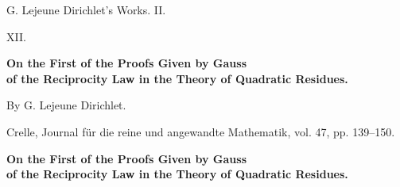 \documentclass[11pt]{article}
\begin{document}
\begin{center}
{\Large G. Lejeune Dirichlet's Works. II.}\par\vspace{1.2em}
{\Large XII.}\par\vspace{0.5em}
{\LARGE \textbf{On the First of the Proofs Given by Gauss\\ of the Reciprocity Law in the Theory of Quadratic Residues.}}\par\vspace{1em}
{\large By G. Lejeune Dirichlet.}\par\vspace{0.5em}
{\small Crelle, Journal für die reine und angewandte Mathematik, vol. 47, pp. 139--150.}
\end{center}

\begin{center}
{\large \textbf{On the First of the Proofs Given by Gauss\\ of the Reciprocity Law in the Theory of Quadratic Residues.}}
\end{center}
\end{document}
